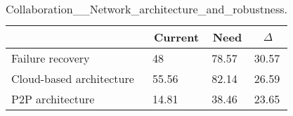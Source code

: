 
  \begin{table*}[]
  \centering
  \notsotiny
  \caption{ Collaboration__Network_architecture_and_robustness.}
\label{tab:collaboration__network_architecture_and_robustness}
\begin{tabular}{|l|l|l|l|}
  \hline
  \rowcolor[HTML]{C0C0C0}
    \multicolumn{1}{|c|}{Feature} & \multicolumn{1}{c|}{Current} & \multicolumn{1}{c|}{Need} & \multicolumn{1}{c|}{$\Delta$} \\ \hline
  Failure recovery & 48 & 78.57 & 30.57 \\ \hline 
Cloud-based architecture & 55.56 & 82.14 & 26.59 \\ \hline 
P2P architecture & 14.81 & 38.46 & 23.65 \\ \hline 
\end{tabular}%
  \end{table*}